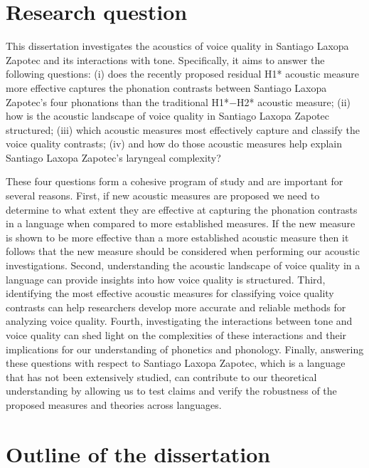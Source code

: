 \section{Research question} \label{sec:research_question}

This dissertation investigates the acoustics of voice quality in Santiago Laxopa Zapotec and its interactions with tone. Specifically, it aims to answer the following questions: (i) does the recently proposed residual H1* acoustic measure more effective captures the phonation contrasts between Santiago Laxopa Zapotec's four phonations than the traditional H1*$-$H2* acoustic measure; (ii) how is the acoustic landscape of voice quality in Santiago Laxopa Zapotec structured; (iii) which acoustic measures most effectively capture and classify the voice quality contrasts; (iv) and how do those acoustic measures help explain Santiago Laxopa Zapotec's laryngeal complexity? 

These four questions form a cohesive program of study and are important for several reasons. First, if new acoustic measures are proposed we need to determine to what extent they are effective at capturing the phonation contrasts in a language when compared to more established measures. If the new measure is shown to be more effective than a more established acoustic measure then it follows that the new measure should be considered when performing our acoustic investigations. Second, understanding the acoustic landscape of voice quality in a language can provide insights into how voice quality is structured. Third, identifying the most effective acoustic measures for classifying voice quality contrasts can help researchers develop more accurate and reliable methods for analyzing voice quality. Fourth, investigating the interactions between tone and voice quality can shed light on the complexities of these interactions and their implications for our understanding of phonetics and phonology. Finally, answering these questions with respect to Santiago Laxopa Zapotec, which is a language that has not been extensively studied, can contribute to our theoretical understanding by allowing us to test claims and verify the robustness of the proposed measures and theories across languages.

\section{Outline of the dissertation } \label{sec:conclusion}

